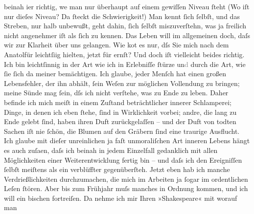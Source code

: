 \begin{ledgroupsized}[t]{13cm}
               beinah i{\geminationm}er richtig, we{\geminationn}
               man nur überhaupt auf einem gewiſſen Niveau ſteht (Wo iſt nur dieſes Niveau? Da
               ſteckt die Schwierigkeit!) Man kennt ſich ſelbſt, und das Streben, nur halb unbewußt,
               geht dahin, ſich \introOben{}ſelbſt\introOben{} miszuverſtehn, was ja freilich nicht
               angenehmer iſt als ſich zu kennen. Das Leben will im allgemeinen doch, daſs wir zur
               Klarheit über uns gelangen.\pend
           \pstart
           Wie ko{\geminationm}t es nur, dſs Sie mich nach dem Anatolfür leichtſi{\geminationn}ig
               hielten, jetzt für ernſt? Und doch iſt vielleicht beides richtig. Ich bin
               leichtſinnig in der Art wie ich in Erlebniſſe ſtürze un\textcolor{gray}{d}{ }\label{T_L00643-1v}\label{T_L00643-1h} durch
               die Art, wie ſie ſich da{\geminationn} meiner bemächtigen. Ich
               glaube, jeder Menſch hat einen großen Lebensfehler, der ihn abhält, ſein Weſen zur
               möglichen Vollendung zu bringen; meine Sünde mag ſein, dſs ich nicht verſtehe, was zu
               Ende zu leben. Daher befinde ich mich meiſt in einem Zuſtand beträchtlicher innerer
               Schlamperei; Dinge, in denen ich eben ſtehe, ſind in Wirklichkeit {\pb}vorbei; andre, die lang zu Ende gelebt ſind, haben
               ihren Duft zurückgelaſſen – und der Duft von todten Sachen iſt nie ſchön, die Blumen
               auf den Gräbern ſind eine traurige Ausflucht. Ich glaube mit dieſer unreinlichen ja
               faſt unmoraliſchen Art inneren Lebens hängt es auch zuſa\textcolor{gray}{{\geminationm}}en, daſs ich beinah in jedem Einzelfall gedanklich mit allen Möglichkeiten
               einer Weiterentwicklung fertig bin – und daſs ich den Ereigniſſen ſelbſt meiſtens als
               ein verblüffter gegenüberſteh.\pend
           \pstart
           {\pb}Jetzt eben hab ich manche Verdrießlichkeiten
               durchzumachen, die mich im Arbeiten ja ſogar im ordentlichen Leſen ſtören. Aber bis
               zum Frühjahr muſs manches in Ordnung kommen, und ich will ein bischen fortreiſen. Da
               nehme ich mir Ihren »Shakespeare« mit worauf man

\end{ledgroupsized}
